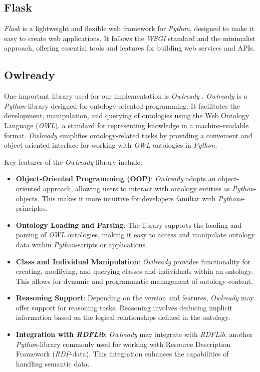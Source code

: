 \subsection{Flask}
\label{sec:flask}
\textit{Flask} \cite{grinberg2018flask} is a lightweight and flexible web framework for \textit{Python}, designed to make it easy to create web applications. It follows the \textit{WSGI} standard and the minimalist approach, offering essential tools and features for building web services and APIs. 

	\subsection{Owlready}
	\label{sec:OWLReady}
	One important library used for our implementation is \textit{Owlready} \cite{LAMY201711}. \textit{Owlready} \cite{LAMY201711} is a \textit{Python}-library designed for ontology-oriented programming. It facilitates the development, manipulation, and querying of ontologies using the Web Ontology Language (\textit{OWL}), a standard for representing knowledge in a machine-readable format. \textit{Owlready} \cite{LAMY201711} simplifies ontology-related tasks by providing a convenient and object-oriented interface for working with \textit{OWL} ontologies in \textit{Python}.

	Key features of the \textit{Owlready} \cite{LAMY201711} library include:

	\begin{itemize}
		\item \textbf{Object-Oriented Programming (OOP)}: \textit{Owlready} \cite{LAMY201711} adopts an object-oriented approach, allowing users to interact with ontology entities as \textit{Python}-objects. This makes it more intuitive for developers familiar with \textit{Pythons}-principles.
		\item \textbf{Ontology Loading and Parsing}: The library supports the loading and parsing of \textit{OWL} ontologies, making it easy to access and manipulate ontology data within \textit{Python}-scripts or applications.
		\item \textbf{Class and Individual Manipulation}: \textit{Owlready} \cite{LAMY201711} provides functionality for creating, modifying, and querying classes and individuals within an ontology. This allows for dynamic and programmatic management of ontology content.
		\item \textbf{Reasoning Support}: Depending on the version and features, \textit{Owlready} \cite{LAMY201711} may offer support for reasoning tasks. Reasoning involves deducing implicit information based on the logical relationships defined in the ontology.
		\item \textbf{Integration with \textit{RDFLib}}: \textit{Owlready} \cite{LAMY201711} may integrate with \textit{RDFLib}, another \textit{Python}-library commonly used for working with Resource Description Framework (\textit{RDF}-data). This integration enhances the capabilities of handling semantic data.
	\end{itemize}

